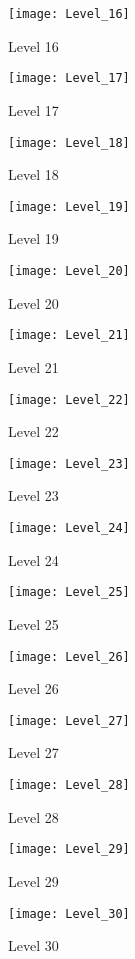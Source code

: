 \begin{figure}
  \centering \texttt{[image: Level\_16]} \caption{Level
    16} \label{fig:level16-pic} \end{figure}
\begin{figure}
  \centering \texttt{[image: Level\_17]} \caption{Level
    17} \label{fig:level17-pic} \end{figure}
\begin{figure}
  \centering \texttt{[image: Level\_18]} \caption{Level
    18} \label{fig:level18-pic} \end{figure}
\begin{figure}
  \centering \texttt{[image: Level\_19]} \caption{Level
    19} \label{fig:level19-pic} \end{figure}
\begin{figure}
  \centering \texttt{[image: Level\_20]} \caption{Level
    20} \label{fig:level20-pic} \end{figure}
\begin{figure}
  \centering \texttt{[image: Level\_21]} \caption{Level
    21} \label{fig:level21-pic} \end{figure}
\begin{figure}
  \centering \texttt{[image: Level\_22]} \caption{Level
    22} \label{fig:level22-pic} \end{figure}
\begin{figure}
  \centering \texttt{[image: Level\_23]} \caption{Level
    23} \label{fig:level23-pic} \end{figure}
\begin{figure}
  \centering \texttt{[image: Level\_24]} \caption{Level
    24} \label{fig:level24-pic} \end{figure}
\begin{figure}
  \centering \texttt{[image: Level\_25]} \caption{Level
    25} \label{fig:level25-pic} \end{figure}
\begin{figure}
  \centering \texttt{[image: Level\_26]} \caption{Level
    26} \label{fig:level26-pic} \end{figure}
\begin{figure}
  \centering \texttt{[image: Level\_27]} \caption{Level
    27} \label{fig:level27-pic} \end{figure}
\begin{figure}
  \centering \texttt{[image: Level\_28]} \caption{Level
    28} \label{fig:level28-pic} \end{figure}
\begin{figure}
  \centering \texttt{[image: Level\_29]} \caption{Level
    29} \label{fig:level29-pic} \end{figure}
\begin{figure}
  \centering \texttt{[image: Level\_30]} \caption{Level
    30} \label{fig:level30-pic} \end{figure}

